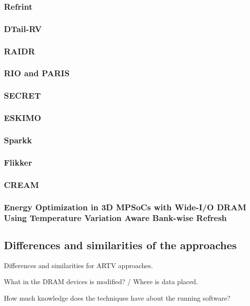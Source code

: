 \subsubsection*{\textbf{Refrint}}
\label{par:refrint}


\subsubsection*{\textbf{DTail-RV}}
\label{par:dtail}


\subsubsection*{\textbf{RAIDR}}
\label{par:raidr}


\subsubsection*{\textbf{RIO and PARIS}}
\label{par:rioparis}


\subsubsection*{\textbf{SECRET}}
\label{par:secret}


\subsubsection*{\textbf{ESKIMO}}
\label{par:eskimo}


\subsubsection*{\textbf{Sparkk}}
\label{par:sparkk}


\subsubsection*{\textbf{Flikker}}
\label{par:flikker}


\subsubsection*{\textbf{CREAM}}
\label{par:cream}



\subsubsection*{\textbf{Energy Optimization in 3D MPSoCs with Wide-I/O DRAM
Using Temperature Variation Aware Bank-wise Refresh}}
\label{par:tempaware}



\subsection{Differences and similarities of the approaches}

Differences and similarities for ARTV approaches.

What in the DRAM devices is modified? / Where is data placed.

How much knowledge does the techniques have about the running software?